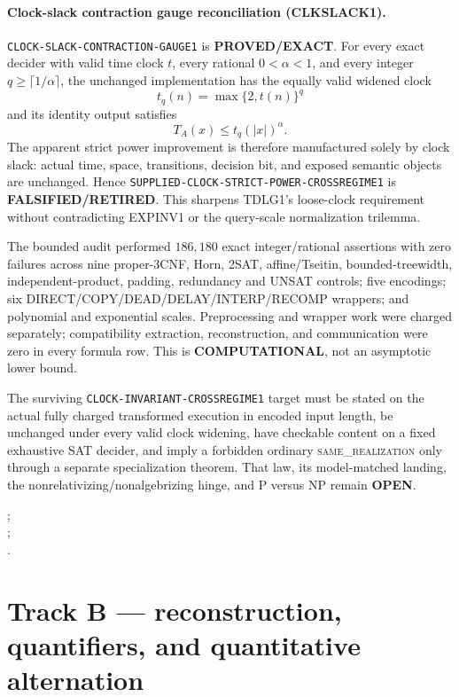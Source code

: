 \documentclass[11pt]{article}
\begin{document}
\paragraph{Clock-slack contraction gauge reconciliation (CLKSLACK1).}
\texttt{CLOCK-SLACK-CONTRACTION-GAUGE1} is
\textbf{PROVED/EXACT}.  For every exact decider with valid time clock \(t\),
every rational \(0<\alpha<1\), and every integer
\(q\ge\lceil1/\alpha\rceil\), the unchanged implementation has the equally
valid widened clock
\[
 t_q(n)=\max\{2,t(n)\}^{q}
\]
and its identity output satisfies
\[
 T_A(x)\le t_q(|x|)^\alpha .
\]
The apparent strict power improvement is therefore manufactured solely by
clock slack: actual time, space, transitions, decision bit, and exposed
semantic objects are unchanged.  Hence
\texttt{SUPPLIED-CLOCK-STRICT-POWER-CROSSREGIME1} is
\textbf{FALSIFIED/RETIRED}.  This sharpens TDLG1's loose-clock requirement
without contradicting EXPINV1 or the query-scale normalization trilemma.

The bounded audit performed \(186{,}180\) exact integer/rational assertions
with zero failures across nine proper-3CNF, Horn, 2SAT, affine/Tseitin,
bounded-treewidth, independent-product, padding, redundancy and UNSAT
controls; five encodings; six DIRECT/COPY/DEAD/DELAY/INTERP/RECOMP wrappers;
and polynomial and exponential scales.  Preprocessing and wrapper work were
charged separately; compatibility extraction, reconstruction, and
communication were zero in every formula row.  This is
\textbf{COMPUTATIONAL}, not an asymptotic lower bound.

The surviving \texttt{CLOCK-INVARIANT-CROSSREGIME1} target must be stated on
the actual fully charged transformed execution in encoded input length, be
unchanged under every valid clock widening, have checkable content on a fixed
exhaustive SAT decider, and imply a forbidden ordinary
\textsc{same\_realization} only through a separate specialization theorem.
That law, its model-matched landing, the nonrelativizing/nonalgebrizing hinge,
and P versus NP remain \textbf{OPEN}.

;\\
;\\
.


\section{Track B --- reconstruction, quantifiers, and quantitative alternation}
\end{document}
